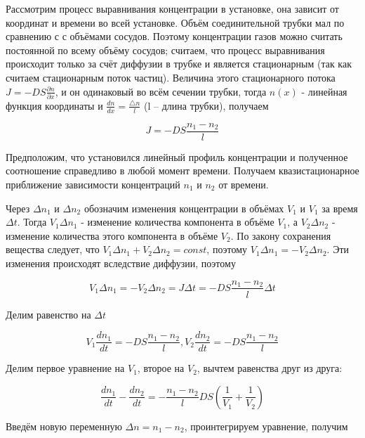 \documentclass[a4paper,12pt]{article}
\begin{document}
Рассмотрим процесс выравнивания концентрации в установке, она зависит от координат и времени во всей установке. Объём соединительной трубки мал по сравнению с с объёмами сосудов. Поэтому концентрации газов можно считать постоянной по всему объёму сосудов; считаем, что процесс выравнивания происходит только за счёт диффузии в трубке и является стационарным (так как считаем стационарным поток частиц). Величина этого стационарного потока $J = -DS\frac{\partial n}{\partial x}$, и он одинаковый во всём сечении трубки, тогда $n(x)$ - линейная функция координаты и $\frac{dn}{dx} = \frac{\triangle n}{l}$ (l -- длина трубки), получаем 

\begin{equation}
    J = -DS \frac{n_1-n_2}{l}
\end{equation}

Предположим, что установился линейный профиль концентрации и полученное соотношение справедливо в любой момент времени. Получаем квазистационарное приближение зависимости концентраций $n_1$ и $n_2$ от времени.

Через $\Delta n_1$ и $\Delta n_2$ обозначим изменения концентрации в объёмах $V_1$ и $V_1$ за время $\Delta t$. Тогда $V_1 \Delta n_1$ - изменение количества компонента в объёме $V_1$, а $V_2 \Delta n_2$ - изменение количества этого компонента в объёме $V_2$. По закону сохранения вещества следует, что $V_1 \Delta n_1 + V_2 \Delta n_2 = const$, поэтому $V_1 \Delta n_1 = - V_2 \Delta n_2$. Эти изменения происходят вследствие диффузии, поэтому

\begin{equation}
    V_1 \Delta n_1 = - V_2 \Delta n_2 = J \Delta t = -DS \frac{n_1-n_2}{l} \Delta t
\end{equation}

Делим равенство на $\Delta t$

\begin{equation}
    V_1 \frac{dn_1}{dt} = -DS\frac{n_1-n_2}{l}, V_2 \frac{dn_2}{dt} = -DS\frac{n_1-n_2}{l}
\end{equation}

Делим первое уравнение на $V_1$, второе на $V_2$, вычтем равенства друг из друга:

\begin{equation}
    \frac{dn_1}{dt}- \frac{dn_2}{dt} = - \frac{n_1-n_2}{l}DS(\frac{1}{V_1} +\frac{1}{V_2} )
\end{equation}

Введём новую переменную $\Delta n = n_1-n_2$, проинтегрируем уравнение, получим
\end{document}
